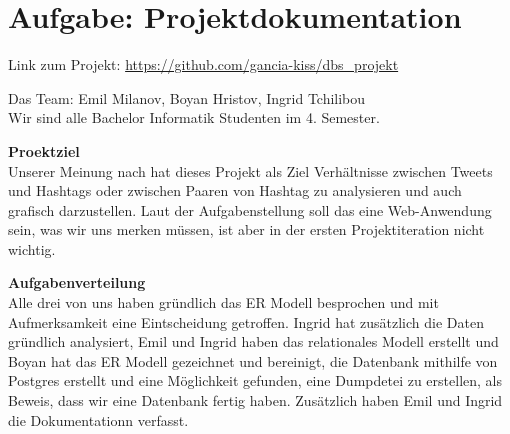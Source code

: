 \usepackage{graphicx}

\newcommand{\dozent}{Prof.  Dr.  Agnès Voisard, Nicolas Lehmann}					%
\newcommand{\tutor}{Hoffman Christian}						%
\newcommand{\tutoriumNo}{Tutorium 3}				%
\newcommand{\projectNo}{1}									%
\newcommand{\veranstaltung}{Datenbank Systeme}	%
\newcommand{\semester}{SoeSe 2017}						%
\newcommand{\studenten}{IngridTchilibou,Emil,Boyan Hristov}			%





\section{Aufgabe: Projektdokumentation}
Link zum Projekt: \url{https://github.com/gancia-kiss/dbs_projekt}

Das Team: Emil Milanov, Boyan Hristov, Ingrid Tchilibou\\
Wir sind alle Bachelor Informatik Studenten im 4. Semester.

\textbf{Proektziel}\\
Unserer Meinung nach hat dieses Projekt als Ziel Verhältnisse zwischen Tweets und Hashtags oder zwischen Paaren von Hashtag zu 
analysieren und auch grafisch darzustellen. Laut der Aufgabenstellung soll das eine Web-Anwendung sein, was wir uns merken 
müssen, ist aber in der ersten Projektiteration nicht wichtig. 


\textbf{Aufgabenverteilung}\\
Alle drei von uns haben gründlich das ER Modell besprochen und mit Aufmerksamkeit eine Eintscheidung getroffen. Ingrid hat zusätzlich die Daten gründlich analysiert, Emil und Ingrid haben das relationales Modell erstellt und Boyan hat das ER Modell gezeichnet und bereinigt, die Datenbank mithilfe von Postgres erstellt und eine Möglichkeit gefunden, eine Dumpdetei zu erstellen, als Beweis, dass wir eine Datenbank fertig haben. Zusätzlich haben Emil und Ingrid die Dokumentationn verfasst.




